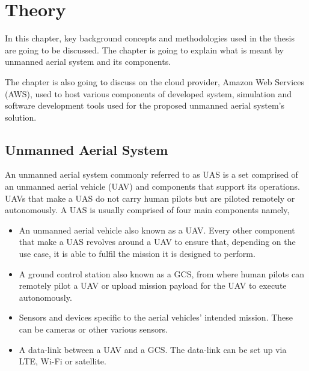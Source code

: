 


\chapter{Theory}
\label{chap:theory}

In this chapter, key background concepts and methodologies used in the thesis are going to be discussed. The chapter is going to explain what is meant by unmanned aerial system and its components.

The chapter is also going to discuss on the cloud provider, Amazon Web Services (AWS), used to host various components of developed system, simulation and software development tools used for the proposed unmanned aerial system's solution.



\section{Unmanned Aerial System}
\label{sec:unmanned-aerial-system}

An unmanned aerial system commonly referred to as UAS is a set comprised of an unmanned aerial vehicle (UAV) and components that support its operations. UAVs that make a UAS do not carry human pilots but are piloted remotely or autonomously. A UAS is usually comprised of four main components namely,

\begin{itemize}
    \item An unmanned aerial vehicle also known as a UAV. Every other component that make a UAS revolves around a UAV to ensure that, depending on the use case, it is able to fulfil the mission it is designed to perform.
    \item A ground control station also known as a GCS, from where human pilots can remotely pilot a UAV or upload mission payload for the UAV to execute autonomously.
    \item Sensors and devices specific to the aerial vehicles' intended mission. These can be cameras or other various sensors.
    \item A data-link between a UAV and a GCS. The data-link can be set up via LTE, Wi-Fi or satellite.
\end{itemize}

